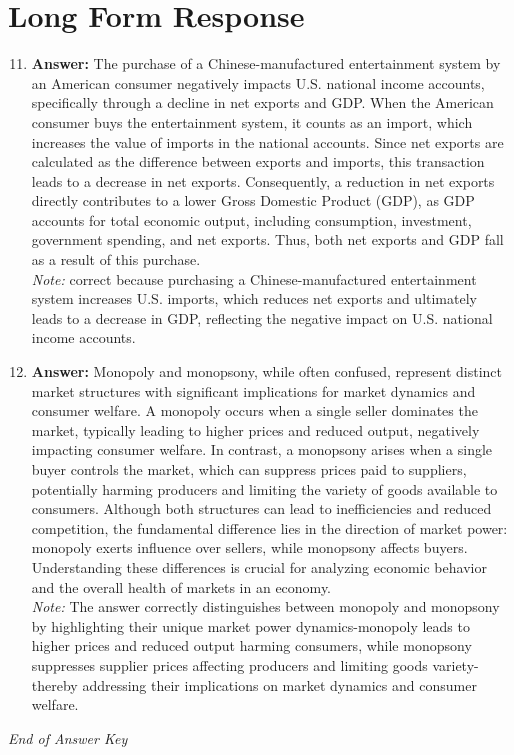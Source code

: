\documentclass[12pt]{article}
\begin{document}
\section*{Long Form Response}
\begin{enumerate}[label=\arabic*.]
\setcounter{enumi}{10}
\item \textbf{Answer:} The purchase of a Chinese-manufactured entertainment system by an American consumer negatively impacts U.S. national income accounts, specifically through a decline in net exports and GDP. When the American consumer buys the entertainment system, it counts as an import, which increases the value of imports in the national accounts. Since net exports are calculated as the difference between exports and imports, this transaction leads to a decrease in net exports. Consequently, a reduction in net exports directly contributes to a lower Gross Domestic Product (GDP), as GDP accounts for total economic output, including consumption, investment, government spending, and net exports. Thus, both net exports and GDP fall as a result of this purchase.
\\ \textit{Note:} correct because purchasing a Chinese-manufactured entertainment system increases U.S. imports, which reduces net exports and ultimately leads to a decrease in GDP, reflecting the negative impact on U.S. national income accounts.
\item \textbf{Answer:} Monopoly and monopsony, while often confused, represent distinct market structures with significant implications for market dynamics and consumer welfare. A monopoly occurs when a single seller dominates the market, typically leading to higher prices and reduced output, negatively impacting consumer welfare. In contrast, a monopsony arises when a single buyer controls the market, which can suppress prices paid to suppliers, potentially harming producers and limiting the variety of goods available to consumers. Although both structures can lead to inefficiencies and reduced competition, the fundamental difference lies in the direction of market power: monopoly exerts influence over sellers, while monopsony affects buyers. Understanding these differences is crucial for analyzing economic behavior and the overall health of markets in an economy.
\\ \textit{Note:} The answer correctly distinguishes between monopoly and monopsony by highlighting their unique market power dynamics-monopoly leads to higher prices and reduced output harming consumers, while monopsony suppresses supplier prices affecting producers and limiting goods variety-thereby addressing their implications on market dynamics and consumer welfare.
\end{enumerate}

\vfill
\noindent\textit{End of Answer Key}
\end{document}
